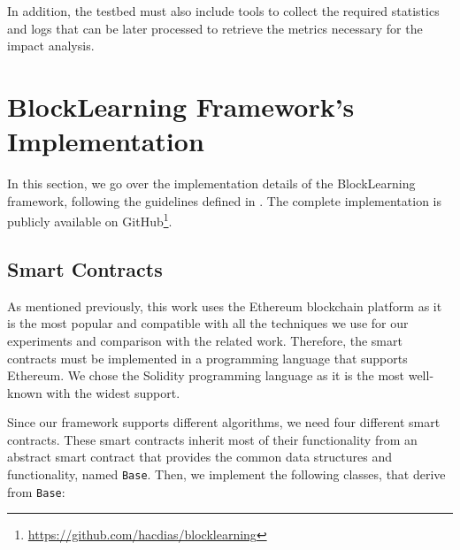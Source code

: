In addition, the testbed must also include tools to collect the required statistics and logs that can be later processed to retrieve the metrics necessary for the impact analysis.

\section{BlockLearning Framework's Implementation}

In this section, we go over the implementation details of the BlockLearning framework, following the guidelines defined in . The complete implementation is publicly available on GitHub\footnote{\url{https://github.com/hacdias/blocklearning}}.

\subsection{Smart Contracts}

As mentioned previously, this work uses the Ethereum \cite{wood2014ethereum} blockchain platform as it is the most popular and compatible with all the techniques we use for our experiments and comparison with the related work. Therefore, the smart contracts must be implemented in a programming language that supports Ethereum. We chose the Solidity \cite{solidity} programming language as it is the most well-known with the widest support.

Since our framework supports different algorithms, we need four different smart contracts. These smart contracts inherit most of their functionality from an abstract smart contract that provides the common data structures and functionality, named \texttt{Base}. Then, we implement the following classes, that derive from \texttt{Base}:

